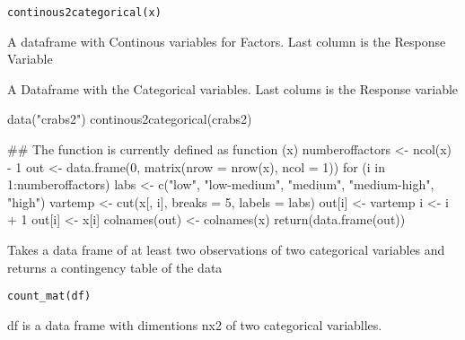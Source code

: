 \documentclass[letterpaper]{book}
\begin{document}
%
\begin{Usage}
\begin{verbatim}
continous2categorical(x)
\end{verbatim}
\end{Usage}
%
\begin{Arguments}
\begin{ldescription}
\item[\code{x}] A dataframe with Continous variables for Factors. Last column is the Response Variable
\end{ldescription}
\end{Arguments}
%
\begin{Value}
A Dataframe with the Categorical variables. Last colums is the Response variable





\end{Value}
%
\begin{Examples}
\begin{ExampleCode}

data("crabs2")
continous2categorical(crabs2)

## The function is currently defined as
function (x) 
{
    numberoffactors <- ncol(x) - 1
    out <- data.frame(0, matrix(nrow = nrow(x), ncol = 1))
    for (i in 1:numberoffactors) {
        labs <- c("low", "low-medium", "medium", "medium-high", 
            "high")
        vartemp <- cut(x[, i], breaks = 5, labels = labs)
        out[i] <- vartemp
    }
    i <- i + 1
    out[i] <- x[i]
    colnames(out) <- colnames(x)
    return(data.frame(out))
  }
\end{ExampleCode}
\end{Examples}
%
\begin{Description}\relax
Takes a data frame of at least two observations of two categorical variables 
and returns a contingency table of the data 
\end{Description}
%
\begin{Usage}
\begin{verbatim}
count_mat(df)
\end{verbatim}
\end{Usage}
%
\begin{Arguments}
\begin{ldescription}
\item[\code{df}] 
df is a data frame with dimentions nx2 of two categorical variablles. 

\end{ldescription}
\end{Arguments}
\end{document}
